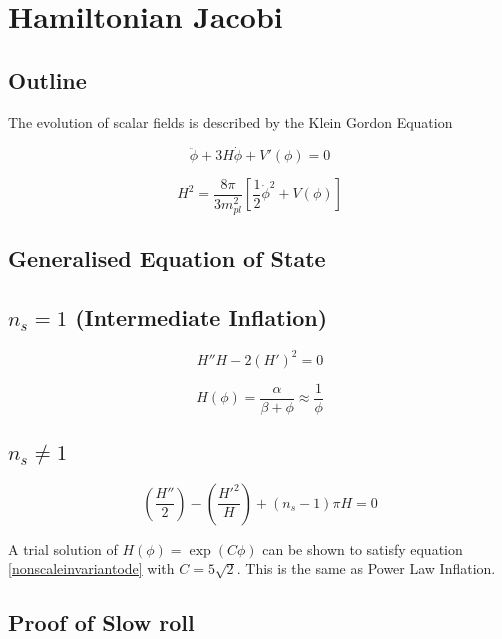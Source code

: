 \documentclass[12pt]{article} %
\begin{document}
\section{Hamiltonian Jacobi}

\subsection{Outline}

The evolution of scalar fields is described by the Klein \cite{goldstein} Gordon Equation

\begin{equation}
\ddot{\phi} + 3H\dot{\phi}+V'(\phi)=0
\end{equation}

\begin{equation}
H^{2}=\frac{8\pi}{3 m_{pl}^{2}}[\frac{1}{2}\dot{\phi}^{2}+V(\phi)]
\end{equation}

\subsection{Generalised Equation of State}

\subsection{$n_{s}=1$ (Intermediate Inflation)}

\begin{equation}
H''H - 2(H')^{2}=0
\end{equation}

\begin{equation}
H(\phi) = \frac{\alpha}{\beta + \phi} \approx \frac{1}{\phi}
\end{equation}

\subsection{$n_{s} \neq 1$}

\begin{equation}\label{nonscaleinvariantode}
\left( \frac{H''}{2}\right) - \left( \frac{H'^{2}}{H}\right) + \left( n_{s} - 1\right)\pi H = 0
\end{equation}

A trial solution of $H(\phi) = \exp(C\phi)$ can be shown to satisfy equation \ref{nonscaleinvariantode} with $C=5\sqrt{2}$. This is the same as Power Law Inflation.

\subsection{Proof of Slow roll}
\end{document}
